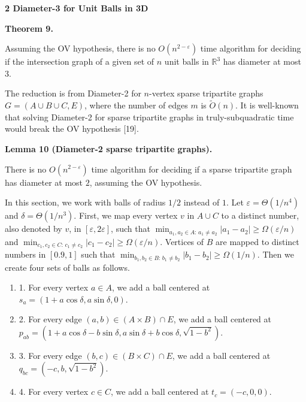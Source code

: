 \par\medskip\noindent\textbf{2 Diameter-3 for Unit Balls in 3D}\par
\par\medskip\noindent\textbf{Theorem 9.}\par
Assuming the OV hypothesis, there is no $O(n^{2-\varepsilon})$ time algorithm for deciding if the intersection graph of a given set of $n$ unit balls in $\mathbb{R}^{3}$ has diameter at most 3.
\par
\par
\par
The reduction is from Diameter-2 for $n$-vertex sparse tripartite graphs $G=(A\cup B\cup C,E)$, where the number of edges $m$ is $\tilde{O}(n)$. It is well-known that solving Diameter-2 for sparse tripartite graphs in truly-subquadratic time would break the OV hypothesis [19].
\par
\par
\par\medskip\noindent\textbf{Lemma 10 (Diameter-2 sparse tripartite graphs).}\par
There is no $O(n^{2-\varepsilon})$ time algorithm for deciding if a sparse tripartite graph has diameter at most $2$, assuming the OV hypothesis.
\par
\par
\par
In this section, we work with balls of radius $1/2$ instead of $1$. Let $\varepsilon=\Theta(1/n^{4})$ and $\delta=\Theta(1/n^{3})$. First, we map every vertex $v$ in $A\cup C$ to a distinct number, also denoted by $v$, in $[\varepsilon,2\varepsilon]$, such that $\min_{a_{1},a_{2}\in A:\,a_{1}\neq a_{2}}|a_{1}-a_{2}|\geq\Omega(\varepsilon/n)$ and $\min_{c_{1},c_{2}\in C:\,c_{1}\neq c_{2}}|c_{1}-c_{2}|\geq\Omega(\varepsilon/n)$. Vertices of $B$ are mapped to distinct numbers in $[0.9,1]$ such that $\min_{b_{1},b_{2}\in B:\,b_{1}\neq b_{2}}|b_{1}-b_{2}|\geq\Omega(1/n)$. Then we create four sets of balls as follows.
\par
\par
\begin{enumerate}
\item[]  1. 
For every vertex $a\in A$, we add a ball centered at $s_{a}=(1+a\cos\delta,a\sin\delta,0)$.
\par
\par
\item[]  2. 
For every edge $(a,b)\in(A\times B)\cap E$, we add a ball centered at $p_{ab}=(1+a\cos\delta-b\sin\delta,a\sin\delta+b\cos\delta,\sqrt{1-b^{2}})$.
\par
\par
\item[]  3. 
For every edge $(b,c)\in(B\times C)\cap E$, we add a ball centered at $q_{bc}=(-c,b,\sqrt{1-b^{2}})$.
\par
\par
\item[]  4. 
For every vertex $c\in C$, we add a ball centered at $t_{c}=(-c,0,0)$.
\par
\par
\end{enumerate}
